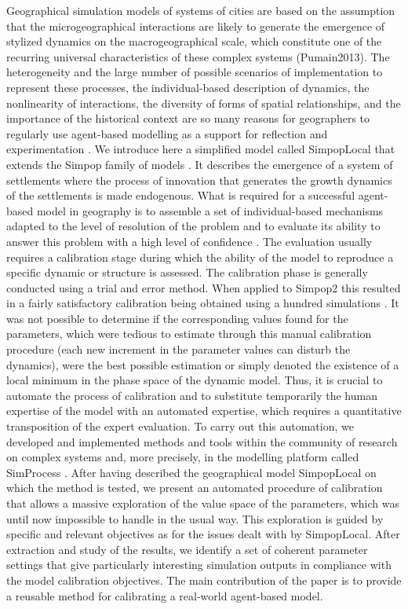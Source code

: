 Geographical simulation models of systems of cities are based on the assumption that the microgeographical interactions are likely to generate the emergence of stylized dynamics on the macrogeographical scale, which constitute one of the recurring universal characteristics of these complex systems (Pumain2013). The heterogeneity and the large number of possible scenarios of implementation to represent these processes, the individual-based description of dynamics, the nonlinearity of interactions, the diversity of forms of spatial relationships, and the importance of the historical context are so many reasons for geographers to regularly use agent-based modelling as a support for reflection and experimentation \autocites{Batty2008, Crooks2008, Heppenstall2011, Sanders2007}. We introduce here a simplified model called SimpopLocal \autocites{Rey-Coyrehourcq2015,Schmitt2014} that extends the Simpop family of models \autocites{Pumain2011,Pumain2009}. It describes the emergence of a system of settlements where the process of innovation that generates the growth dynamics of the settlements is made endogenous. What is required for a successful agent-based model in geography is to assemble a set of individual-based mechanisms adapted to the level of resolution of the problem and to evaluate its ability to answer this problem with a high level of confidence \autocite{Sargent2005}. The evaluation usually requires a calibration stage \autocite{Balci1998} during which the ability of the model to reproduce a specific dynamic or structure is assessed. The calibration phase is generally conducted using a trial and error method. When applied to Simpop2 this resulted in a fairly satisfactory calibration being obtained using a hundred simulations \autocite{Bretagnolle2010}. It was not possible to determine if the corresponding values found for the parameters, which were tedious to estimate through this manual calibration procedure (each new increment in the parameter values can disturb the dynamics), were the best possible estimation or simply denoted the existence of a local minimum in the phase space of the dynamic model. Thus, it is crucial to automate the process of calibration and to substitute temporarily the human expertise of the model with an automated expertise, which requires a quantitative transposition of the expert evaluation. To carry out this automation, we developed and implemented methods and tools within the community of research on complex systems \autocite{Bourgine2009} and, more precisely, in the modelling platform called SimProcess \autocite{Rey-Coyrehourcq2015}. After having described the geographical model SimpopLocal on which the method is tested, we present an automated procedure of calibration that allows a massive exploration of the value space of the parameters, which was until now impossible to handle in the usual way. This exploration is guided by specific and relevant objectives as for the issues dealt with by SimpopLocal. After extraction and study of the results, we identify a set of coherent parameter settings that give particularly interesting simulation outputs in compliance with the model calibration objectives. The main contribution of the paper is to provide a reusable method for calibrating a real-world agent-based model.

